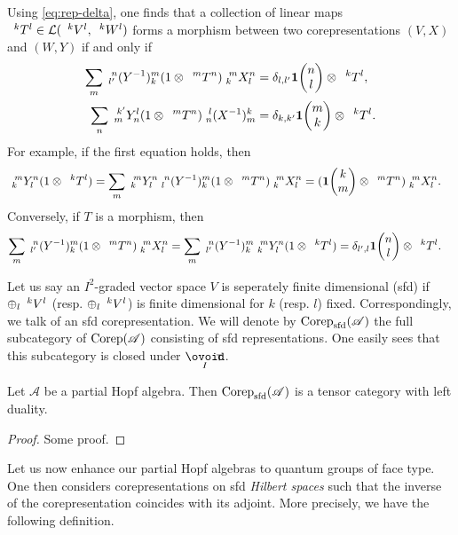  \begin{Rem}\label{RemMorRep} %
 Using \eqref{eq:rep-delta}, one finds that a collection of linear maps $\Gru{T}{k}{l} \in
\mathcal{L}(\Gru{V}{k}{l},\Gru{W}{k}{l})$ forms a morphism between two corepresentations
$(V,X)$ and $(W,Y)$  if
and only if
  \begin{align} 
    \sum_{m} \Gr{(Y^{-1})}{n}{m}{l'}{k}(1 \otimes
    \Gru{T}{m}{n})\Gr{X}{m}{n}{k}{l} &= \delta_{l,l'}
    \UnitC{n}{l} \otimes \Gru{T}{k}{l}, \\
    \sum_{n} \Gr{Y}{k'}{l}{m}{n}(1 \otimes
    \Gru{T}{m}{n})\Gr{(X^{-1})}{l}{k}{n}{m} &= \delta_{k,k'}
    \UnitC{m}{k} \otimes \Gru{T}{k}{l}.
 \end{align}
For example, if the first equation holds, then
\begin{align*}
  \Gr{Y}{m}{n}{k}{l} (1 \otimes \Gru{T}{k}{l}) &=
  \sum_{m}  \Gr{Y}{m}{n}{k}{l} \Gr{(Y^{-1})}{n}{m}{l}{k}(1 \otimes
  \Gru{T}{m}{n})\Gr{X}{m}{n}{k}{l} = (\UnitC{k}{m}\otimes \Gru{T}{m}{n})\Gr{X}{m}{n}{k}{l}.
\end{align*}
Conversely, if $T$ is a morphism, then
\begin{align*}
  \sum_{m} \Gr{(Y^{-1})}{n}{m}{l'}{k}(1 \otimes
  \Gru{T}{m}{n})\Gr{X}{m}{n}{k}{l} &= \sum_{m}
  \Gr{(Y^{-1})}{n}{m}{l'}{k} \Gr{Y}{m}{n}{k}{l}(1 \otimes
  \Gru{T}{k}{l}) = \delta_{l',l} \UnitC{n}{l} \otimes
  \Gru{T}{k}{l}.
\end{align*}
\end{Rem}

Let us say an $I^2$-graded vector space $V$ is seperately finite dimensional (sfd) if $\oplus_l \Gru{V}{k}{l}$ (resp. $\oplus_l \Gru{V}{k}{l}$) is finite dimensional for $k$ (resp. $l$) fixed. Correspondingly, we talk of an sfd corepresentation. We will denote by $\Corep_{\sfd}(\mathscr{A})$ the full subcategory of $\Corep(\mathscr{A})$ consisting of sfd representations. One easily sees that this subcategory is closed under $\Circt$. 

\begin{Lem} Let $\mathscr{A}$ be a partial Hopf algebra. Then $\Corep_{\sfd}(\mathscr{A})$ is a tensor category with left duality. 
\end{Lem} 

\begin{proof} Some proof.
\end{proof}

Let us now enhance our partial Hopf algebras to quantum groups of face type. One then considers corepresentations on sfd \emph{Hilbert spaces} such that the inverse of the corepresentation coincides with its adjoint. More precisely, we have the following definition.

